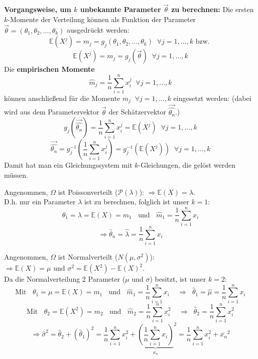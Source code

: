 \textbf{Vorgangsweise, um $k$ unbekannte Parameter $\vec\theta$ zu berechnen:}
    Die ersten $k$-Momente der Verteilung können als Funktion der Parameter $\vec\theta=(\theta_1,\theta_2,...,\theta_k)$ ausgedrückt werden:
        \[\mathbb{E}(X^j)=m_j=g_j(\theta_1, \theta_2, ..., \theta_k)\;\;\forall j=1,...,k\text{ bzw. }\]
        \[\mathbb{E}(X^j)=m_j=g_j(\vec\theta)\;\;\forall j=1,...,k\]
        Die \textbf{empirischen Momente}
        \[\hat m_j=\frac{1}{n}\sum_{i=1}^n x_i^j\;\;\forall j=1,...,k\]
        können anschließend für die Momente $m_j\;\;\forall j=1,...,k$ eingesetzt werden: (dabei wird aus dem Parametervektor $\vec\theta$ der Schätzervektor $\vec{\hat{\theta_n}}$.)
        \[g_j(\vec{\hat{\theta_n}})=\frac{1}{n}\sum_{i=1}^n x_i^j=\mathbb{E}(X^j)\;\;\forall j=1,...,k\]
        \[\vec{\hat{\theta_n}}=g_j^{-1}\left(\frac{1}{n}\sum_{i=1}^n x_i^j\right)=g_j^{-1}(\mathbb{E}(X^j))\;\;\forall j=1,...,k\]
        Damit hat man ein Gleichungssystem mit $k$-Gleichungen, die gelöst werden müssen.

\begin{bsp}
Angenommen, $\Omega$ ist Poissonverteilt ($\mathcal P(\lambda)$): $\Rightarrow\mathbb{E}(X)=\lambda$.\\
D.h. nur ein Parameter $\lambda$ ist zu berechnen, folglich ist unser $k=1$:
\[\theta_1=\lambda=\mathbb{E}(X)=m_1\;\;\text{ und }\;\;\hat m_1=\frac{1}{n}\sum_{i=1}^n x_i\]
\[\Rightarrow \hat\theta_n=\hat\lambda=\frac{1}{n}\sum_{i=1}^nx_i\]
\end{bsp}

\begin{bsp}
Angenommen, $\Omega$ ist Normalverteilt ($N(\mu, \sigma^2)$): \\
$\Rightarrow\mathbb{E}(X)=\mu$ und $\sigma^2=\mathbb{E}(X^2)-\mathbb{E}(X)^2$.\\
Da die Normalverteilung 2 Parameter ($\mu$ und $\sigma$) besitzt, ist unser $k=2$:
\[\text{Mit }\;\;\theta_1=\mu=\mathbb{E}(X)=m_1\;\;\text{ und }\;\;\hat m_1=\frac{1}{n}\sum_{i=1}^n x_i\;\;\;\;\Rightarrow\;\;\hat\theta_1=\hat\mu=\frac{1}{n}\sum_{i=1}^nx_i\]
\[\text{Mit }\;\;\theta_2=\mathbb{E}(X^2)=m_2\;\;\text{ und }\;\;\hat m_2=\frac{1}{n}\sum_{i=1}^n x_i^2\;\;\;\;\Rightarrow\;\;\hat\theta_2=\frac{1}{n}\sum_{i=1}^nx_i^2\]
\[\Rightarrow \hat\sigma^2=\hat\theta_2+(\hat\theta_1)^2=\frac{1}{n}\sum_{i=1}^nx_i^2+{\underbrace{\left(\frac{1}{n}\sum_{i=1}^nx_i\right)}_{\overline{x_n}}}^2=\frac{1}{n}\sum_{i=1}^nx_i^2+\overline{x_n}^2\]
\end{bsp}

